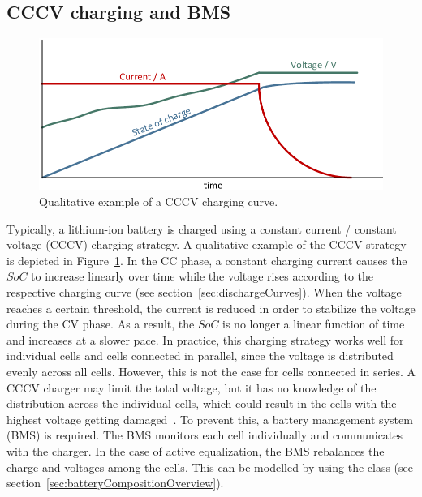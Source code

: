 \subsection{CCCV charging and BMS}
\label{sec:cccv_BMS}
\begin{figure}[t!]
	\captionsetup{type=figure}
	\centering
	\includegraphics[width=\textwidth]{cccv_qualitative}
	\caption[Qualitative example of a CCCV charging curve]{Qualitative example of a CCCV charging curve.}
	\label{fig:cccv_qualitative}
\end{figure}
Typically, a lithium-ion battery is charged using a constant current / constant voltage (CCCV) charging strategy. A qualitative example of the CCCV strategy is depicted in Figure~\ref{fig:cccv_qualitative}. In the CC phase, a constant charging current causes the $SoC$ to increase linearly over time while the voltage rises according to the respective charging curve (see section~\ref{sec:dischargeCurves}). When the voltage reaches a certain threshold, the current is reduced in order to stabilize the voltage during the CV phase. As a result, the $SoC$ is no longer a linear function of time and increases at a slower pace. In practice, this charging strategy works well for individual cells and cells connected in parallel, since the voltage is distributed evenly across all cells. However, this is not the case for cells connected in series. A CCCV charger may limit the total voltage, but it has no knowledge of the distribution across the individual cells, which could result in the cells with the highest voltage getting damaged~\cite{andrea_battery_2010}. To prevent this, a battery management system (BMS) is required. The BMS monitors each cell individually and communicates with the charger. In the case of active equalization, the BMS rebalances the charge and voltages among the cells. This can be modelled by using the  class (see section~\ref{sec:batteryCompositionOverview}).

